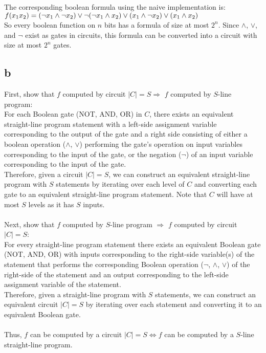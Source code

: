 \documentclass[letterpaper,notitlepage,twoside]{article}
\begin{document}
The corresponding boolean formula using the naive implementation is:
$f(x_1x_2) = (\neg x_1 \land \neg x_2) \lor \\
\neg(\neg x_1 \land x_2) \lor \\
(x_1 \land \neg x_2) \lor \\
(x_1 \land x_2)$ \\

So every boolean function on $n$ bits has a formula of size at most $2^n$.
Since $\land$, $\lor$, and $\neg$ exist as gates in circuits, this formula can be converted into a circuit with size at most $2^n$ gates.

\subsection*{b}
First, show that $f$ computed by circuit $|C| = S \Rightarrow$ $f$ computed by $S$-line program: \\
For each Boolean gate (NOT, AND, OR) in $C$, there exists an equivalent straight-line program statement with a left-side assignment variable corresponding to the output of the gate and a right side consisting of either a boolean operation ($\land$, $\lor$) performing the gate's operation on input variables corresponding to the input of the gate, or the negation ($\neg$) of an input variable corresponding to the input of the gate. \\
Therefore, given a circuit $|C| = S$, we can construct an equivalent straight-line program with $S$ statements by iterating over each level of $C$ and converting each gate to an equivalent straight-line program statement. Note that $C$ will have at most $S$ levels as it has $S$ inputs. \\ \\
Next, show that $f$ computed by $S$-line program $\Rightarrow$ $f$ computed by circuit $|C| = S$: \\
For every straight-line program statement there exists an equivalent Boolean gate (NOT, AND, OR) with inputs corresponding to the right-side variable(s) of the statement that performs the corresponding Boolean operation ($\neg$, $\land$, $\lor$) of the right-side of the statement and an output corresponding to the left-side assignment variable of the statement. \\
Therefore, given a straight-line program with $S$ statements, we can construct an equivalent circuit $|C| = S$ by iterating over each statement and converting it to an equivalent Boolean gate. \\ \\
Thus, $f$ can be computed by a circuit $|C| = S \Leftrightarrow f$ can be computed by a $S$-line straight-line program.
\end{document}
